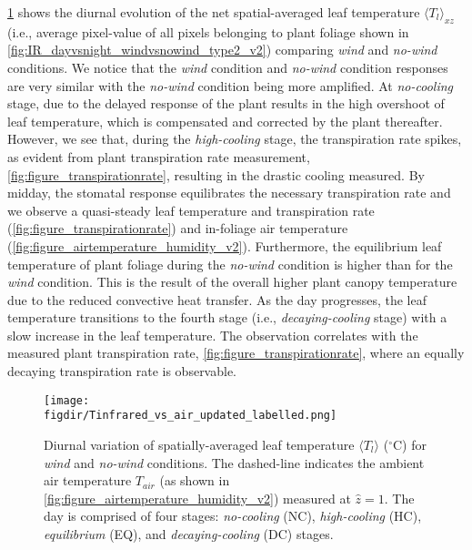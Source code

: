 \cref{fig:Tprofile_2} shows the diurnal evolution of the net spatial-averaged leaf temperature $\langle T_l \rangle_{\textit{xz}}$ (i.e., average pixel-value of all pixels belonging to plant foliage shown in \cref{fig:IR_dayvsnight_windvsnowind_type2_v2}) comparing \textit{wind} and \textit{no-wind} conditions. We notice that the \textit{wind} condition and \textit{no-wind} condition responses are very similar with the \textit{no-wind} condition being more amplified. At \textit{no-cooling} stage, due to the delayed response of the plant results in the high overshoot of leaf temperature, which is compensated and corrected by the plant thereafter. However, we see that, during the \textit{high-cooling} stage, the transpiration rate spikes, as evident from plant transpiration rate measurement, \cref{fig:figure_transpirationrate}, resulting in the drastic cooling measured. By midday, the stomatal response equilibrates the necessary transpiration rate and we observe a quasi-steady leaf temperature and transpiration rate (\cref{fig:figure_transpirationrate}) and in-foliage air temperature (\cref{fig:figure_airtemperature_humidity_v2}). Furthermore, the equilibrium leaf temperature of plant foliage during the \textit{no-wind} condition is higher than for the \textit{wind} condition. This is the result of the overall higher plant canopy temperature due to the reduced convective heat transfer. As the day progresses, the leaf temperature transitions to the fourth stage (i.e., \textit{decaying-cooling} stage) with a slow increase in the leaf temperature. The observation correlates with the measured plant transpiration rate, \cref{fig:figure_transpirationrate}, where an equally decaying transpiration rate is observable. 

	\begin{figure}[t]
	\centering
	\texttt{[image: \\figdir/Tinfrared\_vs\_air\_updated\_labelled.png]}
	\caption{Diurnal variation of spatially-averaged leaf temperature $\langle T_l \rangle$ ($^{\circ}$C) for \textit{wind} and \textit{no-wind} conditions. The dashed-line indicates the ambient air temperature $T_{\textit{air}}$ (as shown in \cref{fig:figure_airtemperature_humidity_v2}) measured at $\hat{z}=1$. The day is comprised of four stages: \textit{no-cooling} (NC), \textit{high-cooling} (HC), \textit{equilibrium} (EQ), and \textit{decaying-cooling} (DC) stages.}
	\label{fig:Tprofile_2}
	\end{figure}

